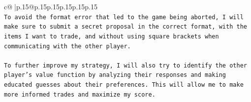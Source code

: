 \documentclass{article}
\begin{document}
{\begin{supertabular}{c@{$\;$}|p{.15\linewidth}@{}p{.15\linewidth}p{.15\linewidth}p{.15\linewidth}p{.15\linewidth}p{.15\linewidth}}
{{{\\ 
\texttt{To avoid the format error that led to the game being aborted, I will make sure to submit a secret proposal in the correct format, with the items I want to trade, and without using square brackets when communicating with the other player.} \\
\\ 
\texttt{To further improve my strategy, I will also try to identify the other player's value function by analyzing their responses and making educated guesses about their preferences. This will allow me to make more informed trades and maximize my score.} \\
            }
        }
    }
     \\ \\

\end{supertabular}
}
\end{document}
